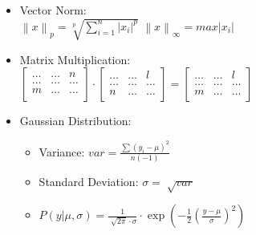 \documentclass[twocolumn, 10pt]{article}
\begin{document}
\begin{itemize}[leftmargin=*, itemsep=0pt]
    \item Vector Norm: \\[2pt]
    $\displaystyle\left\lVert x\right\rVert _p=\sqrt[p]{\sum_{i=1}^n\left\lvert x_i\right\rvert ^p}$ \;\;\;\;\; $\displaystyle\left\lVert x\right\rVert _\infty=max \left\lvert x_i\right\rvert  $

    \newpage
    \item Matrix Multiplication: \\[3pt]
    $\begin{bmatrix}
        \ldots & \ldots & n \\
        \ldots & \ldots & \ldots \\
        m & \ldots & \ldots \\
    \end{bmatrix} \cdot
    \begin{bmatrix}
        \ldots & \ldots & l \\
        \ldots & \ldots & \ldots \\
        n & \ldots & \ldots \\
    \end{bmatrix} =
    \begin{bmatrix}
        \ldots & \ldots & l \\
        \ldots & \ldots & \ldots \\
        m & \ldots & \ldots \\
    \end{bmatrix}$

    \item Gaussian Distribution:
    \begin{itemize}[topsep=0pt]
        \item Variance: $\displaystyle var=\frac{\sum(y_i-\mu)^2}{n(-1)}$
        \item Standard Deviation: $\displaystyle \sigma=\sqrt[]{var}$
        \item $\displaystyle  P(y|\mu,\sigma)=\frac{1}{\sqrt[]{2\pi}\cdot\sigma}\cdot\exp\left(-\frac{1}{2}\left(\frac{y-\mu}{\sigma}\right)^2\right)$
    \end{itemize}


\end{itemize}
\end{document}
